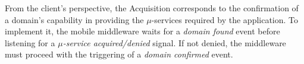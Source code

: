 
%
%	
%	
%	


From the client's perspective, the Acquisition corresponds to the confirmation of a domain's capability in providing the $\mu$-services required by the application. To implement it, the mobile middleware waits for a \textit{domain found} event before listening for a \textit{$\mu$-service acquired/denied} signal. If not denied, the middleware must proceed with the triggering of a \textit{domain confirmed} event.

%
%
%	
%	
%	
%	


